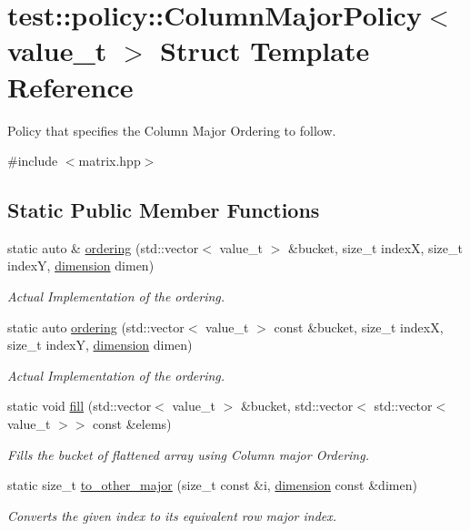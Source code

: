 \hypertarget{structtest_1_1policy_1_1ColumnMajorPolicy}{}\section{test\+::policy\+::Column\+Major\+Policy$<$ value\+\_\+t $>$ Struct Template Reference}
\label{structtest_1_1policy_1_1ColumnMajorPolicy}


Policy that specifies the Column Major Ordering to follow.  




{\ttfamily \#include $<$matrix.\+hpp$>$}

\subsection*{Static Public Member Functions}
\begin{DoxyCompactItemize}
\item 
static auto \& \mbox{\hyperlink{structtest_1_1policy_1_1ColumnMajorPolicy_a2c37e5bb792a6e4935b9b5e62acfc800}{ordering}} (std\+::vector$<$ value\+\_\+t $>$ \&bucket, size\+\_\+t indexX, size\+\_\+t indexY, \mbox{\hyperlink{structtest_1_1dimension}{dimension}} dimen)
\begin{DoxyCompactList}\small\item\em Actual Implementation of the ordering. \end{DoxyCompactList}\item 
static auto \mbox{\hyperlink{structtest_1_1policy_1_1ColumnMajorPolicy_a2dc89adaae586c1c417c5d929166f5b0}{ordering}} (std\+::vector$<$ value\+\_\+t $>$ const \&bucket, size\+\_\+t indexX, size\+\_\+t indexY, \mbox{\hyperlink{structtest_1_1dimension}{dimension}} dimen)
\begin{DoxyCompactList}\small\item\em Actual Implementation of the ordering. \end{DoxyCompactList}\item 
static void \mbox{\hyperlink{structtest_1_1policy_1_1ColumnMajorPolicy_afd5927c90a00e01ab205acf03eae64d2}{fill}} (std\+::vector$<$ value\+\_\+t $>$ \&bucket, std\+::vector$<$ std\+::vector$<$ value\+\_\+t $>$$>$ const \&elems)
\begin{DoxyCompactList}\small\item\em Fills the bucket of flattened array using Column major Ordering. \end{DoxyCompactList}\item 
static size\+\_\+t \mbox{\hyperlink{structtest_1_1policy_1_1ColumnMajorPolicy_adf7d721b9b17e134f36fa92eb267ad33}{to\+\_\+other\+\_\+major}} (size\+\_\+t const \&i, \mbox{\hyperlink{structtest_1_1dimension}{dimension}} const \&dimen)
\begin{DoxyCompactList}\small\item\em Converts the given index to its equivalent row major index. \end{DoxyCompactList}\end{DoxyCompactItemize}



